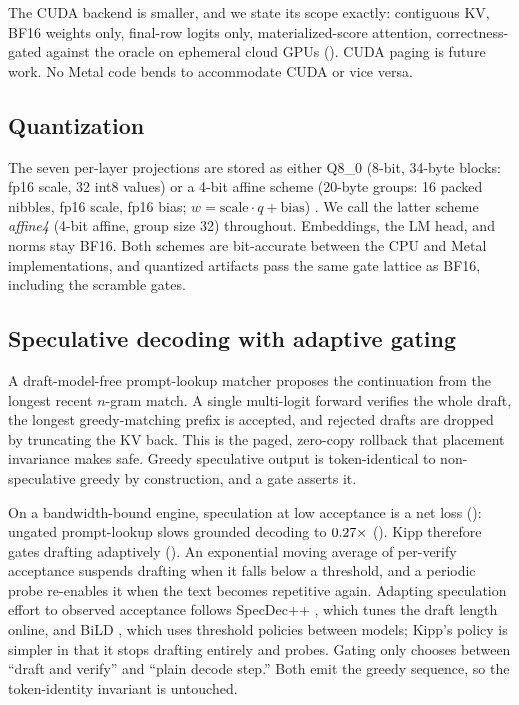 \documentclass[sigconf,nonacm,screen]{acmart}
\begin{document}
The CUDA backend is smaller, and we state its scope exactly: contiguous KV,
BF16 weights only, final-row logits only, materialized-score attention,
correctness-gated against the oracle on ephemeral cloud GPUs
().
CUDA paging is future work. No Metal code bends to accommodate CUDA or vice
versa.

\subsection{Quantization}
\label{sec:impl-quant}
The seven per-layer projections are stored as either Q8\_0 (8-bit, 34-byte
blocks: fp16 scale, 32 int8 values) or a 4-bit affine scheme (20-byte groups:
16 packed nibbles, fp16 scale, fp16 bias; $w=\text{scale}\cdot q+\text{bias}$)
\citep{frantar2023gptq,lin2024awq,llamacpp2023gguf}. We call the latter
scheme \emph{affine4} (4-bit affine, group size 32) throughout. Embeddings,
the LM head, and norms stay BF16. Both schemes are bit-accurate between the
CPU and Metal implementations, and quantized artifacts pass the same gate
lattice as BF16, including the scramble gates.

\subsection{Speculative decoding with adaptive gating}
\label{sec:impl-spec}
A draft-model-free prompt-lookup matcher \citep{saxena2023promptlookup}
proposes the continuation from the longest recent $n$-gram match. A single
multi-logit forward verifies the whole draft, the longest greedy-matching
prefix is accepted, and rejected drafts are dropped by truncating the KV
back. This is the paged, zero-copy rollback that placement invariance makes
safe. Greedy speculative output is token-identical to non-speculative greedy
by construction, and a gate asserts it.

On a bandwidth-bound engine, speculation at low acceptance is a net loss
(): ungated prompt-lookup slows grounded decoding to
$0.27\times$ (). Kipp therefore gates drafting
adaptively (). An exponential moving average of per-verify
acceptance suspends drafting when it falls below a threshold, and a periodic
probe re-enables it when the text becomes repetitive again. Adapting
speculation effort to observed acceptance follows SpecDec++
\citep{huang2025specdecpp}, which tunes the draft length online, and BiLD
\citep{kim2023bild}, which uses threshold policies between models; Kipp's
policy is simpler in that it stops drafting entirely and probes. Gating only
chooses between ``draft and verify'' and ``plain decode step.'' Both emit
the greedy sequence, so the token-identity invariant is untouched.
\end{document}
